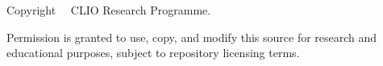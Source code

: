 \cleardoublepage
\thispagestyle{empty}
\null\vfill
\begin{center}
Copyright \textcopyright\ \the\year\ CLIO Research Programme.

Permission is granted to use, copy, and modify this source for research and educational purposes, subject to repository licensing terms.
\end{center}
\vfill\null
